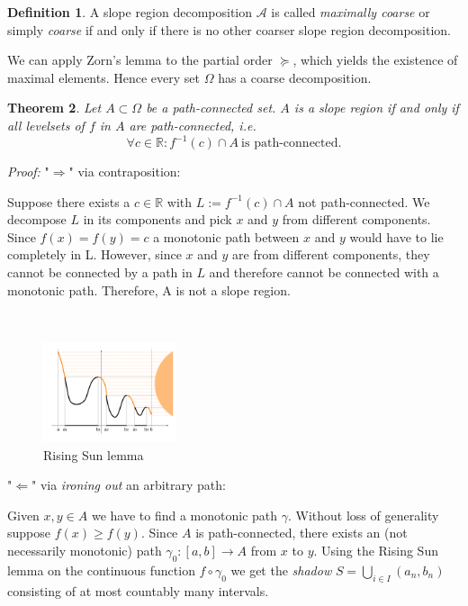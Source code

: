 \documentclass[a4paper,10pt,notitlepage,fullpage]{paper}
\theoremstyle{plain}
\newtheorem{thm}{Theorem}[section] %
\theoremstyle{definition}
\newtheorem{defn}[thm]{Definition} %
\begin{document}
\begin{defn}
A slope region decomposition $\mathcal{A}$ is called \emph{maximally coarse} or simply \emph{coarse} if and only if there is no other coarser slope region decomposition.
\end{defn}

We can apply Zorn's lemma \cite{zorn1935remark} to the partial order $\succeq$, which yields the existence of maximal elements.
Hence every set $\Omega$ has a coarse decomposition.

\begin{thm}
\label{slope_iff_conn_lvlsets}
Let $A \subset \Omega$ be a path-connected set.
$A$ is a slope region if and only if all levelsets of $f$ in $A$ are path-connected, i.e.
\begin{equation*}
\forall c \in \mathbb{R}: f^{-1}(c) \cap A ~ \text{is path-connected}.
\end{equation*}
\end{thm}

\emph{Proof:} "$\Rightarrow$" via contraposition:

Suppose there exists a $c \in \mathbb{R}$ with $L := f^{-1}(c) \cap A$ not path-connected.
We decompose $L$ in its components and pick $x$ and $y$ from different components.
Since $f(x) = f(y) = c$ a monotonic path between $x$ and $y$ would have to lie completely in L.
However, since $x$ and $y$ are from different components, they cannot be connected by a path in $L$ and therefore cannot be connected with a monotonic path.
Therefore, A is not a slope region.

$~$

\begin{figure}
\centering
\includegraphics[width=0.35\textwidth]{img/Rising_sun_lemma.png}
\caption{Rising Sun lemma}
\label{fig:lemma_1}
\end{figure}

"$\Leftarrow$" via \emph{ironing out} an arbitrary path:

Given $x, y \in A$ we have to find a monotonic path $\gamma$.
Without loss of generality suppose $f(x) \geq f(y)$.
Since $A$ is path-connected, there exists an (not necessarily monotonic) path $\gamma_0: [a,b] \to A$ from $x$ to $y$.
Using the Rising Sun lemma \cite{riesz1932theoreme} on the continuous function $f \circ \gamma_0$ we get the \emph{shadow} $S = \bigcup_{i \in I} (a_n, b_n)$ consisting of at most countably many intervals.
\end{document}
